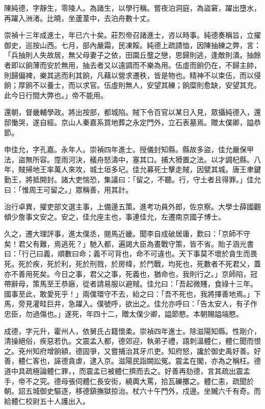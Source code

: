 \begin{pinyinscope}
陳純德，字靜生，零陵人。為諸生，以學行稱。嘗夜泊洞庭，為盜窘，躍出墮水，再躍入洲渚。比曉，坐蘆葦中，去泊舟數十丈。

崇禎十三年成進士，年已六十矣。莊烈帝召諸進士，咨以時事。純德奏稱旨，立擢御史，巡按山西。七月，部內嚴霜，民凍餒。純德上疏請恤，因陳抽練之弊，言：「兵抽則人失故居，無父母妻子之依，田園丘壟之戀，思歸則逃，逢敵則潰。抽餘者即以餉薄而安於無用，抽去者又以遠調而不樂為用。伍虛而餉仍在，不歸主帥，則歸偏裨，樂其逃而利其餉，凡藉以營求遷秩，皆是物也。精神不以束伍，而以侵餉；厚餉不以養士，而以求官。伍虛則無人，安望其練；餉糜則愈缺，安望其充。此今日行間大弊也。」帝不能用。

還朝，督畿輔學政。將出按部，都城陷。賊下令百官以某日入見，眾攝純德入，還邸慟哭，遂自經。京山人秦嘉系買地葬之永定門外，立石表墓焉。贈太僕卿，謚恭節。

申佳允，字孔嘉。永年人。崇禎四年進士。授儀封知縣。縣故多盜，佳允嚴保甲法，盜無所容。霪雨河決，艤舟怒濤中，塞其口。捕大猾置之法。以才調杞縣。八年，賊掃地王率萬人來攻，城土垣多圮。佳允募死士擊走賊，因甓其城。唐王聿鍵勤王，將抵開封。諸大吏惴恐，集議曰：「留之，不聽。行，守土者且得罪。」佳允曰：「惟周王可留之。」眾稱善，用其計。

治行卓異，擢吏部文選主事，上備邊五策。進考功員外郎，佐京察。大學士薛國觀傾少詹事文安之。安之，佳允座主也，事連佳允，左遷南京國子博士。

久之，遷大理評事，進太僕丞，閱馬近畿。聞李自成破居庸，歎曰：「京師不守矣！君父有難，焉逃死？」馳入都，遍謁大臣為畫戰守策，皆不省。貽子涵光書曰：「行己曰義，順數曰命；義不可背也，命不可違也。天下事莫不壞於貪生而畏死。死於疾，死於利，死於刑戮，於房幃，於鬥戰，均死也，死數者不死君父，蓋亦不善用死矣。今日之事，君父之事，死義也，猶命也，我則行之。」京師陷，冠帶辭母，策馬至王恭廠，從者請易服以避賊。佳允曰：「吾起微賤，食祿十三年。國事至此，敢愛死乎！」兩僕環守不去，紿之曰：「吾不死也，我將擇善地焉。」下馬，旁見灌畦巨井，急躍入。僕號呼，欲出之。佳允亦呼曰：「告太安人，有子作忠臣，勿過傷也。」遂死，年四十二，贈太僕少卿，謚節愍。本朝賜謚端愍。

成德，字元升，霍州人，依舅氏占籍懷柔。崇禎四年進士。除滋陽知縣。性剛介，清操絕俗，疾惡若仇。文震孟入都，德郊迎，執弟子禮，語刺溫體仁，體仁聞而恨之。兗州知府增餉額，德固爭，又嘗捕治其牙爪吏。知府怒，讒於御史禹好善。好善，體仁客也，誣德貪虐，逮入京。滋陽民詣闕訟冤。震孟在閣，亦為之稱枉。德道中具疏極論體仁罪，，而震孟已被體仁擠而去之。好善再劾德，言其疏出震孟手，帝不之究。德母張伺體仁長安街，繞輿大罵，拾瓦礫擲之。體仁恚，疏聞於朝。詔五城御史驅逐，移德鎮撫獄掠治。杖六十午門外，戍邊。坐贓六千有奇。而給體仁校尉五十人護出入。


\end{pinyinscope}
